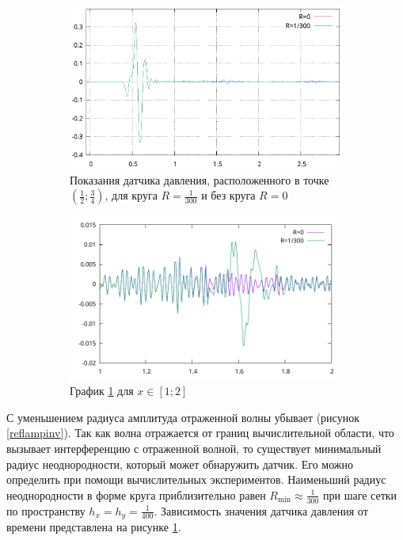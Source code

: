 \documentclass[a4paper, fontsize=14pt]{article}
\begin{document}
\begin{figure}
    \centering
	\begin{subfigure}{1\textwidth}
	\centering
	\includegraphics[width=1\textwidth]{sensor.eps}
	\caption{Показания датчика давления, расположенного в точке
	$\left(\frac{1}{2};\frac{3}{4}\right)$, для круга $R = \frac{1}{300}$ и без круга $R=0$}
	\label{sensor}
	\end{subfigure}
	\begin{subfigure}{1\textwidth}
	\centering
	\includegraphics[width=1\textwidth]{sensordiff.pdf}
	\caption{График \ref{sensor} для $x\in[1;2]$}
	\label{sensordiff}
	\end{subfigure}
    \caption{}
\end{figure}

С уменьшением радиуса амплитуда отраженной волны убывает (рисунок \ref{reflampinv}). Так как
волна отражается от границ вычислительной области, что вызывает интерференцию с отраженной волной, 
то существует минимальный радиус неоднородности, который может обнаружить датчик.
Его можно определить при помощи вычислительных экспериментов. Наименьший радиус неоднородности в
форме круга
приблизительно равен $R_\text{min} \approx \frac{1}{300}$ при шаге сетки по пространству $h_x = h_y
= \frac{1}{400}$. Зависимость значения датчика давления от времени представлена на рисунке
\ref{sensor}.
\end{document}
